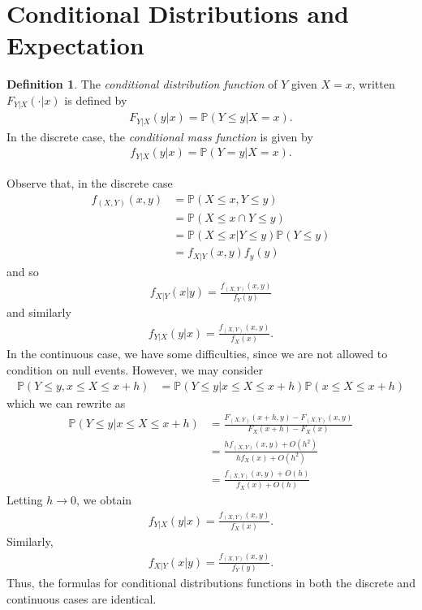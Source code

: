 \documentclass[12pt]{article}
\newcommand{\prob}{\mathbb{P}}
\theoremstyle{plain}
\theoremstyle{definition}
\newtheorem*{definition}{Definition}
\theoremstyle{remark}
\numberwithin{equation}{section}  %
\begin{document}
\section{Conditional Distributions and Expectation}
\begin{definition}
The \emph{conditional distribution function} of $Y$ given $X = x$,
written $F_{Y|X}(\cdot | x)$ is defined by
\begin{align*}
F_{Y|X}(y|x) = \prob (Y \le y | X = x).
\end{align*}
In the discrete case, the \emph{conditional mass function}
is given by
\begin{align*}
f_{Y|X}(y|x) = \prob(Y = y | X = x).
\end{align*}
\end{definition}
Observe that, in the discrete case
\begin{align*}
f_{(X,Y)}(x,y)
& = \prob(X \le x, Y \le y)
\\
& = \prob(X \le x \cap Y \le y)
\\
& = \prob(X \le x | Y \le y) \prob(Y \le y)
\\
& = f_{X|Y}	(x,y) f_y(y)	
\end{align*}
and so
\begin{align*}
f_{X|Y}(x|y) = \frac{f_{(X,Y)}(x,y)}{f_Y(y)}
\end{align*}
and similarly
\begin{align*}
f_{Y|X}(y|x) = \frac{f_{(X,Y)}(x,y)}{f_X(x)}.
\end{align*}
In the continuous case, we have some difficulties, since we are not allowed to
condition on null events. However, we may consider
\begin{align*}
\prob(Y \le y , x \le X \le x + h)
& = \prob(Y \le y | x \le X \le x +h) \prob(x \le X \le x + h)
\end{align*}
which we can rewrite as
\begin{align*}
\prob(Y \le y | x \le X \le x + h)
& = \frac{F_{(X,Y)}(x+h,y ) - F_{(X,Y)}(x,y )}{F_X(x+h) - F_X(x)}
\\
& = \frac{hf_{(X,Y)}(x,y) + O(h^2)}{hf_X(x) + O(h^2)}
\\
& = \frac{f_{(X,Y)}(x,y) + O(h)}{f_X(x) + O(h)}
\end{align*}
Letting $h \to 0$, we obtain
\begin{align*}
f_{Y|X}(y|x) = \frac{f_{(X,Y)}(x,y)}{f_X(x)}.
\end{align*}
Similarly, 
\begin{align*}
f_{X|Y}(x|y) = \frac{f_{(X,Y)}(x,y)}{f_Y(y)}.
\end{align*}
Thus, the formulas for conditional distributions
functions in both the discrete and continuous cases are identical.
\end{document}
